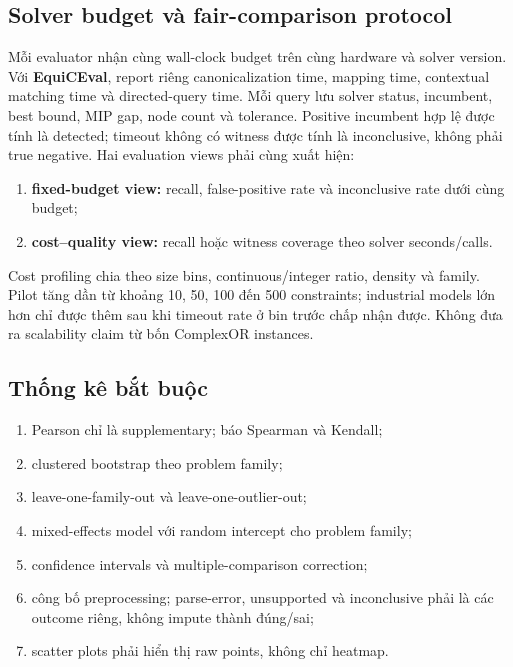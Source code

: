\documentclass[11pt,a4paper]{article}
\newcommand{\method}{\textsf{\textbf{EquiCEval}}\xspace}
\begin{document}
\subsection{Solver budget và fair-comparison protocol}

Mỗi evaluator nhận cùng wall-clock budget trên cùng hardware và solver version.
Với \method, report riêng canonicalization time, mapping time, contextual
matching time và directed-query time. Mỗi query lưu solver status, incumbent,
best bound, MIP gap, node count và tolerance. Positive incumbent hợp lệ được
tính là detected; timeout không có witness được tính là inconclusive, không
phải true negative. Hai evaluation views phải cùng xuất hiện:

\begin{enumerate}
  \item \textbf{fixed-budget view:} recall, false-positive rate và inconclusive
  rate dưới cùng budget;
  \item \textbf{cost--quality view:} recall hoặc witness coverage theo solver
  seconds/calls.
\end{enumerate}

Cost profiling chia theo size bins, continuous/integer ratio, density và
family. Pilot tăng dần từ khoảng 10, 50, 100 đến 500 constraints; industrial
models lớn hơn chỉ được thêm sau khi timeout rate ở bin trước chấp nhận được.
Không đưa ra scalability claim từ bốn ComplexOR instances.

\subsection{Thống kê bắt buộc}

\begin{enumerate}
  \item Pearson chỉ là supplementary; báo Spearman và Kendall;
  \item clustered bootstrap theo problem family;
  \item leave-one-family-out và leave-one-outlier-out;
  \item mixed-effects model với random intercept cho problem family;
  \item confidence intervals và multiple-comparison correction;
  \item công bố preprocessing; parse-error, unsupported và inconclusive phải là
  các outcome riêng, không impute thành đúng/sai;
  \item scatter plots phải hiển thị raw points, không chỉ heatmap.
\end{enumerate}
\end{document}
